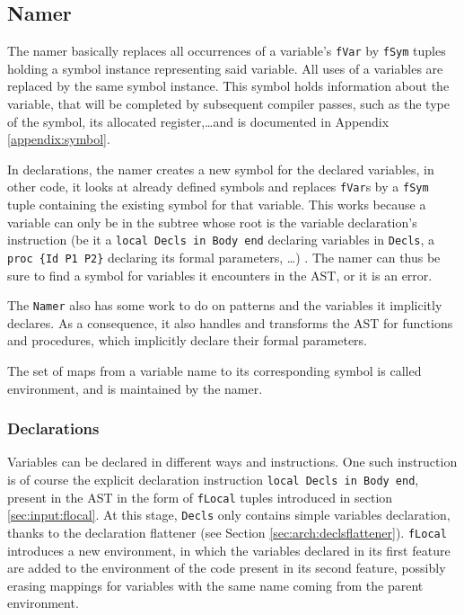 \documentclass[a4paper]{memoir}
\begin{document}
\subsection{Namer}\label{sec:arch:namer}
The namer  basically replaces all occurrences of a variable's \lstinline!fVar! by \lstinline!fSym! tuples holding a symbol instance representing said variable. All uses of a variables are replaced by the same symbol instance. This symbol holds information about the variable, that will be completed by subsequent compiler passes, such as the type of the symbol, its allocated register,\ldots and is documented in Appendix \ref{appendix:symbol}.

In declarations, the namer creates a new symbol for the declared variables, in
other code, it looks at already defined symbols and replaces \lstinline!fVar!s
by a \lstinline!fSym! tuple containing the existing symbol for that variable.
This works because a variable can only be in the subtree whose root is the
variable declaration's instruction (be it a \lstinline!local Decls in Body end!
declaring variables in \lstinline!Decls!, a
\lstinline!proc {Id P1 P2}! declaring its formal parameters, \ldots) . The namer
can thus be sure to find a symbol for variables it encounters in the AST, or it
is an error.

The \lstinline!Namer! also has some work to do on patterns and the variables it
implicitly declares. As a consequence, it also handles and transforms the AST
for functions and procedures, which implicitly declare their formal parameters.

The set of maps from a variable name to its corresponding symbol is called environment, and is maintained by the namer.


\subsubsection{Declarations}
Variables can be declared in different ways and instructions.
One such instruction is of course the explicit declaration instruction
\lstinline!local Decls in Body end!, present in the AST in the form of
\lstinline!fLocal! tuples introduced in section \ref{sec:input:flocal}. At this
stage, \lstinline!Decls! only contains simple variables declaration, thanks to
the declaration flattener (see Section \ref{sec:arch:declsflattener}).
\lstinline!fLocal! introduces a new environment, in which the variables declared
in its first feature are added to the environment of the code present in its
second feature, possibly erasing mappings for variables with the same name
coming from the parent environment. 
\end{document}
